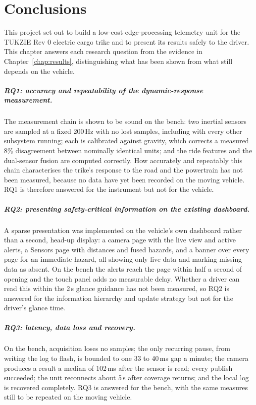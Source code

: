 \chapter{Conclusions}
\label{chap:conclusions}

This project set out to build a low-cost edge-processing telemetry unit for the TUKZIE Rev 0 electric cargo trike and to present its results safely to the driver. This chapter answers each research question from the evidence in Chapter~\ref{chap:results}, distinguishing what has been shown from what still depends on the vehicle.

\paragraph{RQ1: accuracy and repeatability of the dynamic-response measurement.} The measurement chain is shown to be sound on the bench: two inertial sensors are sampled at a fixed 200\,Hz with no lost samples, including with every other subsystem running; each is calibrated against gravity, which corrects a measured 8\% disagreement between nominally identical units; and the ride features and the dual-sensor fusion are computed correctly. How accurately and repeatably this chain characterises the trike's response to the road and the powertrain has not been measured, because no data have yet been recorded on the moving vehicle. RQ1 is therefore answered for the instrument but not for the vehicle.

\paragraph{RQ2: presenting safety-critical information on the existing dashboard.} A sparse presentation was implemented on the vehicle's own dashboard rather than a second, head-up display: a camera page with the live view and active alerts, a Sensors page with distances and fused hazards, and a banner over every page for an immediate hazard, all showing only live data and marking missing data as absent. On the bench the alerts reach the page within half a second of opening and the touch panel adds no measurable delay. Whether a driver can read this within the 2\,s glance guidance has not been measured, so RQ2 is answered for the information hierarchy and update strategy but not for the driver's glance time.

\paragraph{RQ3: latency, data loss and recovery.} On the bench, acquisition loses no samples; the only recurring pause, from writing the log to flash, is bounded to one 33 to 40\,ms gap a minute; the camera produces a result a median of 102\,ms after the sensor is read; every publish succeeded; the unit reconnects about 5\,s after coverage returns; and the local log is recovered completely. RQ3 is answered for the bench, with the same measures still to be repeated on the moving vehicle.

